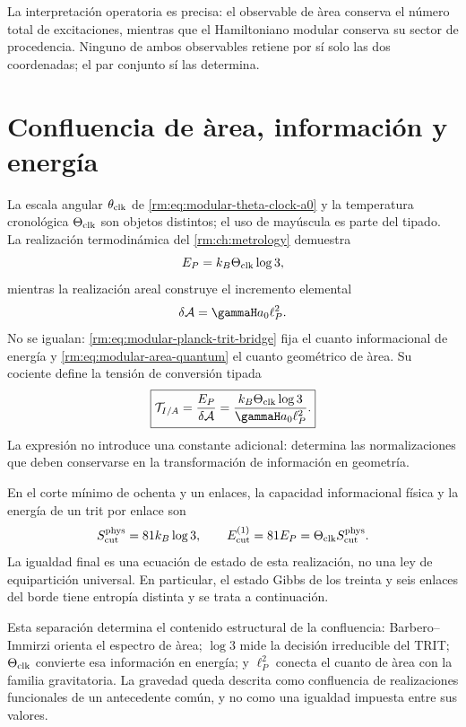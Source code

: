 La interpretaci\'on operatoria es precisa: el observable de \`area conserva
el n\'umero total de excitaciones, mientras que el Hamiltoniano modular
conserva su sector de procedencia. Ninguno de ambos observables retiene por
s\'i solo las dos coordenadas; el par conjunto s\'i las determina.

\section{Confluencia de \`area, informaci\'on y energ\'ia}

La escala angular \(\theta_{\rm clk}\) de
\cref{rm:eq:modular-theta-clock-a0} y la temperatura cronol\'ogica
\(\Theta_{\rm clk}\) son objetos distintos; el uso de may\'uscula es parte
del tipado. La realizaci\'on termodin\'amica del \cref{rm:ch:metrology} demuestra
\begin{equation}
\label{rm:eq:modular-planck-trit-bridge}
E_P=k_B\Theta_{\rm clk}\log3,
\end{equation}
mientras la realizaci\'on areal construye el incremento elemental
\begin{equation}
\label{rm:eq:modular-area-quantum}
\delta\mathcal A
=\gammaH a_0\ell_P^2.
\end{equation}
No se igualan: \cref{rm:eq:modular-planck-trit-bridge} fija el cuanto
informacional de energ\'ia y \cref{rm:eq:modular-area-quantum} el cuanto
geom\'etrico de \`area. Su cociente define la tensi\'on de conversi\'on
tipada
\begin{equation}
\label{rm:eq:modular-information-area-tension}
\boxed{
\mathcal T_{I/A}
=\frac{E_P}{\delta\mathcal A}
=\frac{k_B\Theta_{\rm clk}\log3}
{\gammaH a_0\ell_P^2}.}
\end{equation}
La expresi\'on no introduce una constante adicional: determina las
normalizaciones que deben conservarse en la transformaci\'on de informaci\'on
en geometr\'ia.

\enlargethispage{7\baselineskip}
En el corte m\'inimo de ochenta y un enlaces, la capacidad informacional
f\'isica y la energ\'ia de un trit por enlace son
\begin{equation}
\label{rm:eq:modular-cut-info-energy}
S_{\rm cut}^{\rm phys}=81k_B\log3,
\qquad
E_{\rm cut}^{(1)}=81E_P
=\Theta_{\rm clk}S_{\rm cut}^{\rm phys}.
\end{equation}
La igualdad final es una ecuaci\'on de estado de esta realizaci\'on, no una ley de
equipartici\'on universal. En particular, el estado Gibbs de los treinta y
seis enlaces del borde tiene entrop\'ia distinta y se trata a continuaci\'on.

Esta separaci\'on determina el contenido estructural de la confluencia:
Barbero--Immirzi
orienta el espectro de \`area; \(\log3\) mide la decisi\'on irreducible del
TRIT; \(\Theta_{\rm clk}\) convierte esa informaci\'on en energ\'ia; y
\(\ell_P^2\) conecta el cuanto de \`area con la familia gravitatoria. La
gravedad queda descrita como confluencia de realizaciones funcionales de un
antecedente com\'un, y no como una igualdad impuesta entre sus valores.
